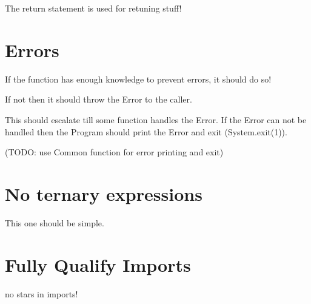 \documentclass[fontsize=11,DIV=10]{scrartcl}
\begin{document}
		The return statement is used for retuning stuff!


\section{Errors}
	If the function has enough knowledge to prevent errors, it should do so!

	If not then it should throw the Error to the caller.


	This should escalate till some function handles the Error.
	If the Error can not be handled then the Program should print the Error and exit (System.exit(1)).

	(TODO: use Common function for error printing and exit)


\section{No ternary expressions}
	This one should be simple.


\section{Fully Qualify Imports}
	no stars in imports!
\end{document}
